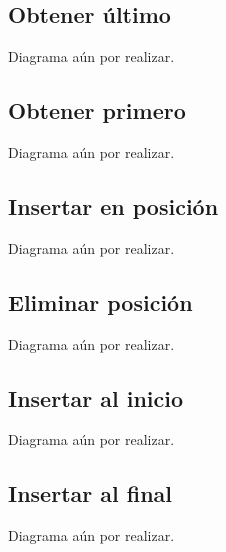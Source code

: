 \subsection {Obtener último}
Diagrama aún por realizar.

\subsection {Obtener primero}
Diagrama aún por realizar.

\subsection {Insertar en posición}
Diagrama aún por realizar.

\subsection {Eliminar posición}
Diagrama aún por realizar.

\subsection {Insertar al inicio}
Diagrama aún por realizar.

\subsection {Insertar al final}
Diagrama aún por realizar.

